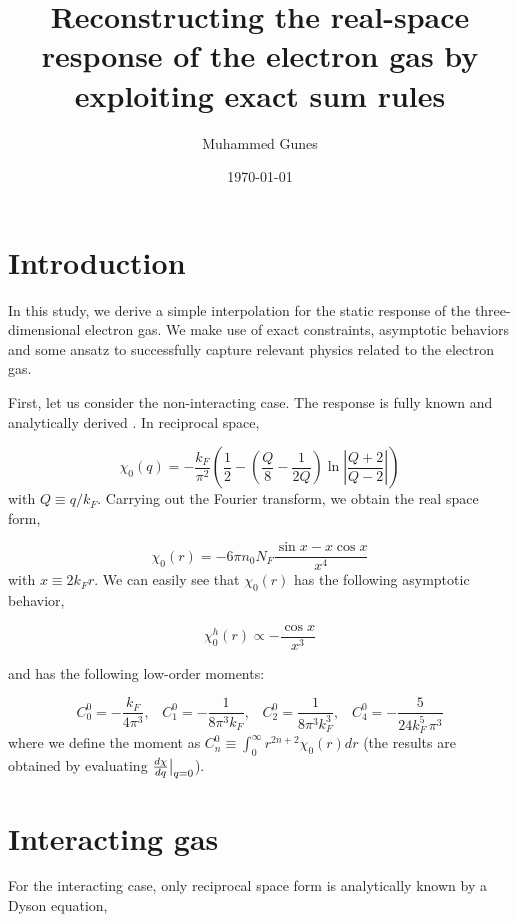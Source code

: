 \documentclass[aps,onecolumn]{revtex4-2}
\begin{document}
\title{Reconstructing the real-space response of the electron gas by exploiting exact sum rules}
\author{Muhammed Gunes}
\date{\today}
\maketitle


\section{Introduction}
In this study, we derive a simple interpolation for the static response of the three-dimensional electron gas. We make use of exact constraints, asymptotic behaviors and some ansatz to successfully capture relevant physics related to the electron gas.

First, let us consider the non-interacting case. The response is fully known and analytically derived \cite{GIULIANI2005}. In reciprocal space,

\begin{equation}
    \chi_0(q) = -\frac{k_F}{\pi^2}\left( \frac{1}2{} - \left(\frac{Q}{8} - \frac{1}{2Q}\right)\ln\left|\frac{Q+2}{Q-2}\right| \right)
\end{equation}
with $Q\equiv q/k_F$. Carrying out the Fourier transform, we obtain the real space form,

\begin{equation}
    \chi_0(r) = -6\pi n_0 N_F \frac{\sin x -x\cos x}{x^4}
\end{equation}
with $x\equiv 2 k_F r$. We can easily see that $\chi_0(r)$ has the following asymptotic behavior,

\begin{equation}
    \chi^h_0(r) \propto -\frac{\cos x}{x^3}
\end{equation}

and has the following low-order moments:

\begin{equation}
    C^0_0 = -\frac{k_F}{4\pi^3}, \;\;\; C^0_1 = -\frac{1}{8\pi^3k_F},\;\;\; C^0_2 = \frac{1}{8\pi^3k_F^3},\;\;\; C^0_4 = -\frac{5}{24k_F^5\,\pi^3}
\end{equation}
where we define the moment as $C^0_n\equiv \int_0^\infty r^{2n+2}\chi_0(r)dr$ (the results are obtained by evaluating $\frac{d\chi}{dq}\big{|}_{q=0}$).

\section{Interacting gas}
For the interacting case, only reciprocal space form is analytically known by a Dyson equation,
\end{document}
